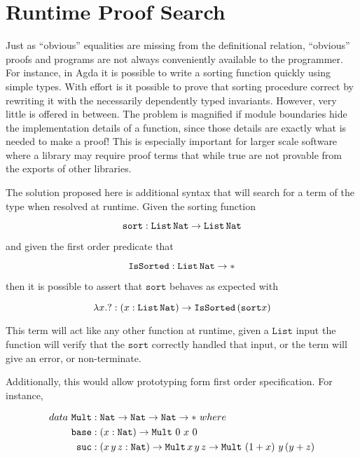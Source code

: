\section{Runtime Proof Search}

Just as ``obvious'' equalities are missing from the definitional relation, ``obvious'' proofs and programs are not always conveniently available to the programmer.
For instance, in Agda it is possible to write a sorting function quickly using simple types.
With effort is it possible to prove that sorting procedure correct by rewriting it with the necessarily dependently typed invariants.
However, very little is offered in between.
The problem is magnified if module boundaries hide the implementation details of a function, since those details are exactly what is needed to make a proof!
This is especially important for larger scale software where a library may require proof terms that while true are not provable from the exports of other libraries.

The solution proposed here is additional syntax that will search for a term of the type when resolved at runtime.
Given the sorting function 

\[
\mathtt{sort}:\mathtt{List}\,\mathtt{Nat}{}\rightarrow\mathtt{List}\,\mathtt{Nat}{}
\]

and given the first order predicate that 

\[
\mathtt{IsSorted}:\mathtt{List}\,\mathtt{Nat}{}\rightarrow*
\]

then it is possible to assert that $\mathtt{sort}$ behaves as expected with

\[
\lambda x.?:\left(x:\mathtt{List}\,\mathtt{Nat}{}\right)\rightarrow\mathtt{IsSorted}\left(\mathtt{sort}x\right)
\]

This term will act like any other function at runtime, given a $\mathtt{List}$ input the function will verify that the $\mathtt{sort}$ correctly handled that input, or the term will give an error, or non-terminate.

Additionally, this would allow prototyping form first order specification.
For instance,

\begin{align*}
data\ \mathtt{Mult} & :\Nat{}\rightarrow\Nat{}\rightarrow\Nat{}\rightarrow*\ where\\
\mathtt{base} & :\left(x:\Nat{}\right)\rightarrow\mathtt{Mult}\ 0\ x\ 0\\
\mathtt{suc} & :\left(x\,y\,z:\Nat{}\right)\rightarrow\mathtt{Mult}\,x\,y\,z\rightarrow\mathtt{Mult}\,\left(1+x\right)\,y\,(y+z)
\end{align*}

